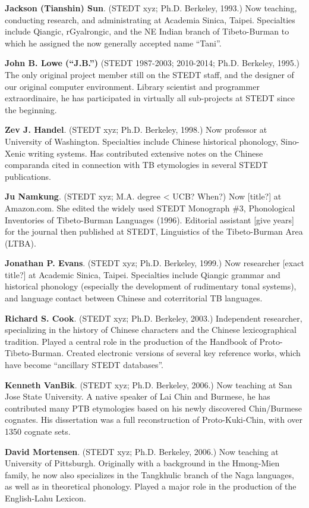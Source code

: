 \textbf{Jackson (Tianshin) Sun}. (STEDT xyz; Ph.D. Berkeley, 1993.) Now teaching, conducting research, and administrating at Academia Sinica, Taipei. Specialties include Qiangic, rGyalrongic, and the NE Indian branch of Tibeto-Burman to which he assigned the now generally accepted name “Tani”.

\textbf{John B. Lowe (“J.B.”)} (STEDT 1987-2003; 2010-2014; Ph.D. Berkeley, 1995.) The only original project member still on the STEDT staff, and the designer of our original computer environment. Library scientist and programmer extraordinaire, he has participated in virtually all sub-projects at STEDT since the beginning.

\textbf{Zev J. Handel}. (STEDT xyz; Ph.D. Berkeley, 1998.) Now professor at University of Washington. Specialties include Chinese historical phonology, Sino-Xenic writing systems. Has contributed extensive notes on the Chinese comparanda cited in connection with TB etymologies in several STEDT publications.

\textbf{Ju Namkung}. (STEDT xyz; M.A. degree < UCB? When?) Now [title?] at Amazon.com. She edited the widely used STEDT Monograph \#3, Phonological Inventories of Tibeto-Burman Languages (1996). Editorial assistant [give years] for the journal then published at STEDT, Linguistics of the Tibeto-Burman Area (LTBA).

\textbf{Jonathan P. Evans}. (STEDT xyz; Ph.D. Berkeley, 1999.) Now researcher [exact title?] at Academic Sinica, Taipei. Specialties include Qiangic grammar and historical phonology (especially the development of rudimentary tonal systems), and language contact between Chinese and coterritorial TB languages.

\textbf{Richard S. Cook}. (STEDT xyz; Ph.D. Berkeley, 2003.) Independent researcher, specializing in the history of Chinese characters and the Chinese lexicographical tradition. Played a central role in the production of the Handbook of Proto-Tibeto-Burman. Created electronic versions of several key reference works, which have become “ancillary STEDT databases”.

\textbf{Kenneth VanBik}. (STEDT xyz; Ph.D. Berkeley, 2006.) Now teaching at San Jose State University. A native speaker of Lai Chin and Burmese, he has contributed many PTB etymologies based on his newly discovered Chin/Burmese cognates. His dissertation was a full reconstruction of Proto-Kuki-Chin, with over 1350 cognate sets.

\textbf{David Mortensen}. (STEDT xyz; Ph.D. Berkeley, 2006.) Now teaching at University of Pittsburgh. Originally with a background in the Hmong-Mien family, he now also specializes in the Tangkhulic branch of the Naga languages, as well as in theoretical phonology. Played a major role in the production of the English-Lahu Lexicon.

